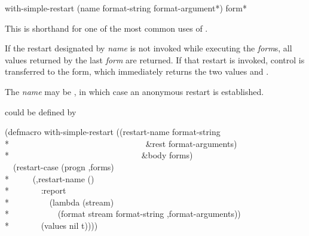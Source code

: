 \begin{defmac}
with-simple-restart (name format-string {format-argument}*)
                    {form}*

  This is shorthand for one of the most common uses of .

  If the restart designated by \emph{name} is not invoked while executing the \emph{form\/}s,
  all values returned by the last \emph{form} are returned. If that
  restart is invoked, control is transferred to the 
  form, which immediately returns the two values  and .

  The \emph{name} may be , in which case an anonymous restart
  is established.

   could be defined by
\begin{lisp}
(defmacro with-simple-restart ((restart-name format-string \\*
~~~~~~~~~~~~~~~~~~~~~~~~~~~~~~~~\&rest format-arguments) \\*
~~~~~~~~~~~~~~~~~~~~~~~~~~~~~~~\&body forms) \\
~~{\Xbq}(restart-case (progn ,{\Xatsign}forms) \\*
~~~~~(,restart-name () \\*
~~~~~~~:report \\*
~~~~~~~~~(lambda (stream) \\*
~~~~~~~~~~~(format stream format-string ,{\Xatsign}format-arguments)) \\*
~~~~~~~(values nil t))))
\end{lisp}


\end{defmac}

